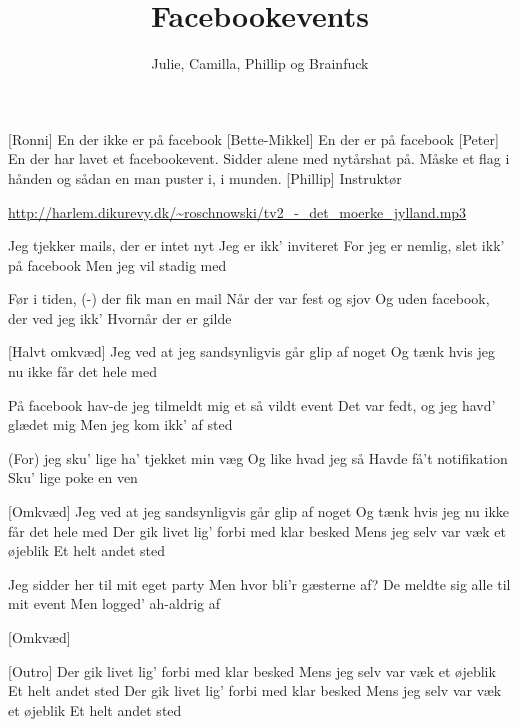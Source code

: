 \documentclass[a4paper,11pt]{article}
\title{Facebookevents}
\author{Julie, Camilla, Phillip og Brainfuck}
\begin{document}
\maketitle

\begin{roles}
[Ronni] En der ikke er på facebook
[Bette-Mikkel] En der er på facebook
[Peter] En der har lavet et facebookevent. Sidder alene med nytårshat på. Måske et flag i hånden og sådan en man puster i, i munden.
[Phillip] Instruktør
\end{roles}

\url{http://harlem.dikurevy.dk/~roschnowski/tv2_-_det_moerke_jylland.mp3}

\begin{song}



Jeg tjekker mails, der er intet nyt
Jeg er ikk' inviteret
For jeg er nemlig, slet ikk' på facebook 
Men jeg vil stadig med


Før i tiden, (-) der fik man en mail
Når der var fest og sjov
Og uden facebook, der ved jeg ikk'
Hvornår der er gilde


[Halvt omkvæd]
Jeg ved at jeg sandsynligvis går glip af noget
Og tænk hvis jeg nu ikke får det hele med


På facebook hav-de jeg tilmeldt mig
et så vildt event
Det var fedt, og jeg havd' glædet mig
Men jeg kom ikk' af sted


(For) jeg sku' lige ha' tjekket min væg
Og like hvad jeg så
Havde få't notifikation
Sku' lige poke en ven


[Omkvæd]
Jeg ved at jeg sandsynligvis går glip af noget
Og tænk hvis jeg nu ikke får det hele med
Der gik livet lig' forbi med klar besked
Mens jeg selv var væk et øjeblik
Et helt andet sted



Jeg sidder her til mit eget party
Men hvor bli'r gæsterne af?
De meldte sig alle til mit event
Men logged' ah-aldrig af

[Omkvæd]


[Outro]
Der gik livet lig' forbi med klar besked
Mens jeg selv var væk et øjeblik
Et helt andet sted
Der gik livet lig' forbi med klar besked
Mens jeg selv var væk et øjeblik
Et helt andet sted


\end{song}
\end{document}
